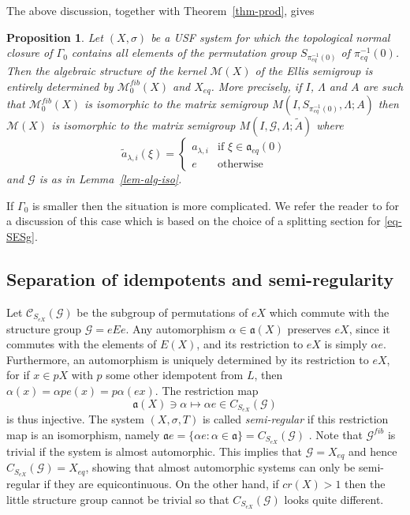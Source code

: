 \documentclass[12pt]{amsart}
\newtheorem{prop}[theorem]{Proposition}
\theoremstyle{definition}
\numberwithin{equation}{section}
\newcommand{\Cc}{{\mathcal C}}
\newcommand{\Gg}{{\mathcal G}}
\newcommand{\Xe}{X_{eq}}
\newcommand{\aut}{{\mathfrak a}}
\newcommand{\aute}{\aut_{eq}}
\newcommand{\pe}{\pi_{eq}}
\newcommand{\M}{\mathcal M}
\begin{document}
 The above discussion,  together with Theorem~\ref{thm-prod}, gives
\begin{prop}\label{prop-alg-kernel}
Let $(X,\sigma)$ be a  USF system for which the topological  normal closure of $\Gamma_0$ contains all elements of the permutation group $S_{\pe^{-1}(0)}$ of $\pe^{-1}(0)$. Then the algebraic structure of the kernel $\M(X)$ of the Ellis semigroup is entirely determined by $\M_0^{fib}(X)$ and $\Xe$. More precisely, if $I$, $\Lambda$ and $A$ are such that 
$\M_0^{fib}(X)$ is isomorphic to the matrix semigroup $M(I,S_{\pe^{-1}(0)},\Lambda;A)$ then  $\M(X)$ is isomorphic to the matrix semigroup $M(I,\Gg,\Lambda;\tilde A)$ where 
$$\tilde a_{\lambda,i}(\xi) = \left\{\begin{array}{ll}
a_{\lambda,i} & \mbox{if } \xi \in \aute(0)\\
e & \mbox{otherwise}
\end{array}\right.$$
and $\Gg$ is as in Lemma~\ref{lem-alg-iso}.
\end{prop}


If $\Gamma_0$ is smaller then the situation is more complicated. We refer the reader to \cite{ESBS} for a discussion of this case which is based on the choice of a splitting section for \eqref{eq-SESg}.

\subsection{Separation of idempotents and semi-regularity}
Let $\Cc_{S_{eX}}(\Gg)$ be the subgroup of permutations of $eX$ which commute with the structure group $\Gg=eEe$. Any automorphism $\alpha\in\aut(X)$ preserves $eX$, since it commutes with the elements of $E(X)$, and its restriction to $eX$ is simply $\alpha e$. Furthermore, an automorphism is uniquely determined by its restriction to $eX$, for if $x\in pX$ with $p$ some other idempotent from $L$, then $\alpha(x) = \alpha p e(x) = p\alpha(ex)$. The restriction map 
$$\aut(X)\ni \alpha\mapsto\alpha e\in C_{S_{eX}}(\Gg)$$ is thus injective. 
The system  $(X,\sigma,T)$ is called {\em semi-regular}  if this restriction map is an isomorphism, namely $\aut e =\{\alpha e:\alpha\in\aut\}= C_{S_{eX}}(\Gg)$ \cite{Auslander-Glasner,ESBS}. 
Note that $\Gg^{fib}$ is trivial if the system is almost automorphic. This implies that $\Gg = \Xe$ and hence $C_{S_{eX}}(\Gg)=\Xe$, showing that almost automorphic systems can only be semi-regular if they are equicontinuous. 
On the other hand, if $cr(X)>1$ then the little structure group cannot be trivial \cite{K25} so that  $C_{S_{eX}}(\Gg)$ looks quite different. 
\end{document}
